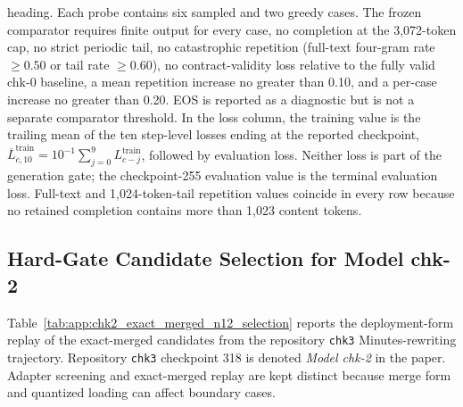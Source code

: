 \begin{table}[htbp]
\begin{minipage}{0.97\textwidth}
        heading. Each probe contains six sampled and two greedy cases. The
        frozen comparator requires finite
        output for every case, no completion at the 3,072-token cap, no strict
        periodic tail, no catastrophic repetition (full-text four-gram rate
        $\geq 0.50$ or tail rate $\geq 0.60$), no contract-validity loss relative
        to the fully valid chk-0 baseline, a mean repetition increase no greater
        than 0.10, and a per-case increase no greater than 0.20. EOS is reported
        as a diagnostic but is not a separate comparator threshold. In the loss
        column, the training value is the trailing mean of the ten step-level
        losses ending at the reported checkpoint,
        $\overline{L}^{\mathrm{train}}_{c,10}=10^{-1}\sum_{j=0}^{9}
        L^{\mathrm{train}}_{c-j}$, followed by evaluation loss. Neither loss is
        part of the generation gate; the checkpoint-255 evaluation value is the
        terminal evaluation loss. Full-text and 1,024-token-tail repetition
        values coincide in every row because no retained completion contains
        more than 1,023 content tokens.
    \end{minipage}
    \caption{Post-cp200 generation-stability hard-gate comparison for
    \textit{Model chk-1}. All evaluated checkpoints pass the frozen gate, so
    the table does not establish checkpoint 200 as uniquely stable. Its
    retention remains supported by the minimum logged evaluation loss together
    with a passing contemporaneous generation probe.}
    \label{tab:app:chk1_post_cp200_hard_gates}
\end{table}

\subsection*{Hard-Gate Candidate Selection for Model chk-2}

Table~\ref{tab:app:chk2_exact_merged_n12_selection} reports the deployment-form
replay of the exact-merged candidates from the repository \texttt{chk3}
Minutes-rewriting trajectory. Repository \texttt{chk3} checkpoint 318 is
denoted \textit{Model chk-2} in the paper. Adapter screening and exact-merged
replay are kept distinct because merge form and quantized loading can affect
boundary cases.

